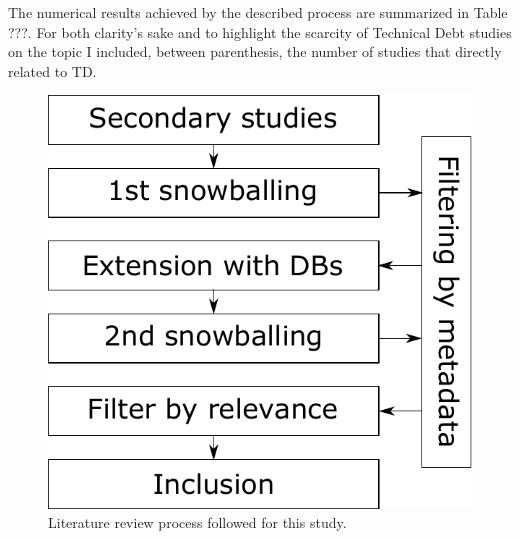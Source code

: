 The numerical results achieved by the described process are summarized in Table ???. For both clarity's sake and to highlight the scarcity of Technical Debt studies on the topic I included, between parenthesis, the number of studies that directly related to TD.

\begin{figure}[h]
    \centering
    \includegraphics[]{figure/literature_review_process.pdf}
    \caption{Literature review process followed for this study.}
    \label{fig:literature_review_process}
\end{figure}
    


